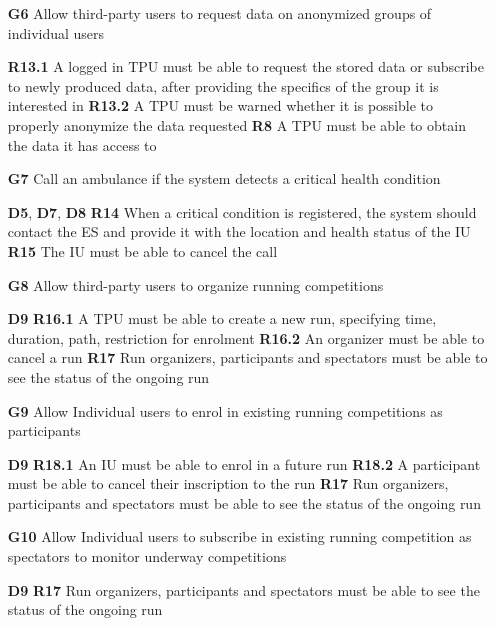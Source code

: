 \begin{itemize}
\item [\textbf{G6}] Allow third-party users to request data on anonymized groups of individual users

\subitem \textbf{R13.1} A logged in TPU must be able to request the stored data or subscribe to newly produced data, after providing the specifics of the group it is interested in
\subitem \textbf{R13.2} A TPU must be warned whether it is possible to properly anonymize the data requested
\subitem \textbf{R8} A TPU must be able to obtain the data it has access to 

\item [\textbf{G7}] Call an ambulance if the system detects a critical health condition

\subitem \textbf{D5}, \textbf{D7}, \textbf{D8}
\subitem \textbf{R14} When a critical condition is registered, the system should contact the ES and provide it with the location and health status of the IU
\subitem \textbf{R15} The IU must be able to cancel the call

\item [\textbf{G8}] Allow third-party users to organize running competitions

\subitem \textbf{D9}
\subitem \textbf{R16.1} A TPU must be able to create a new run, specifying time, duration, path, restriction for enrolment
\subitem \textbf{R16.2} An organizer must be able to cancel a run 
\subitem \textbf{R17} Run organizers, participants and spectators must be able to see the status of the ongoing run

\item [\textbf{G9}] Allow Individual users to enrol in existing running competitions as participants

\subitem \textbf{D9}
\subitem \textbf{R18.1} An IU must be able to enrol in a future run
\subitem \textbf{R18.2} A participant must be able to cancel their inscription to the run 
\subitem \textbf{R17} Run organizers, participants and spectators must be able to see the status of the ongoing run

\item [\textbf{G10}] Allow Individual users to subscribe in existing running competition as spectators to monitor underway competitions

\subitem \textbf{D9} 
\subitem \textbf{R17} Run organizers, participants and spectators must be able to see the status of the ongoing run
\end{itemize}
